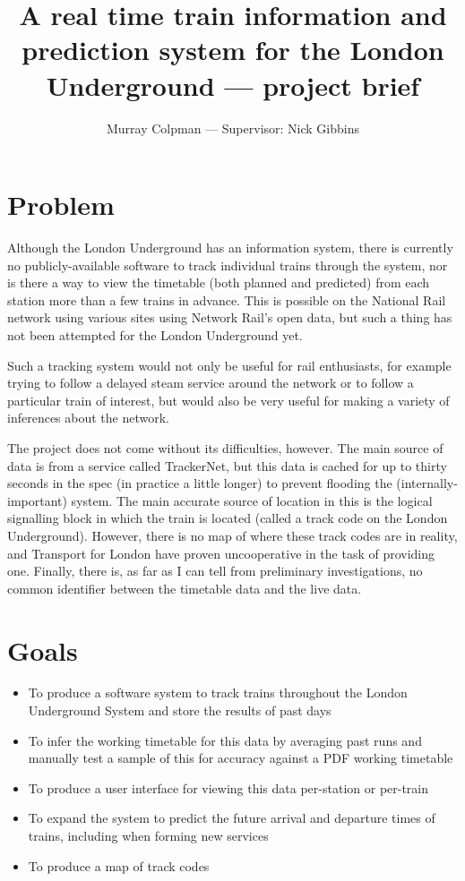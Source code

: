 \documentclass[a4paper,12pt]{article}
\title{A real time train information and prediction system for the London Underground --- project brief}
\author{Murray Colpman --- Supervisor: Nick Gibbins}
\begin{document}
\maketitle

\section*{Problem}

Although the London Underground has an information system, there is currently
no publicly-available software to track individual trains through the system,
nor is there a way to view the timetable (both planned and predicted) from each
station more than a few trains in advance. This is possible on the National
Rail network using various sites using Network Rail's open data, but such a
thing has not been attempted for the London Underground yet.

Such a tracking system would not only be useful for rail enthusiasts, for
example trying to follow a delayed steam service around the network or to
follow a particular train of interest, but would also be very useful for making
a variety of inferences about the network.

The project does not come without its difficulties, however. The main source of
data is from a service called TrackerNet, but this data is cached for up to
thirty seconds in the spec (in practice a little longer) to prevent flooding
the (internally-important) system. The main accurate source of location in this
is the logical signalling block in which the train is located (called a track
code on the London Underground). However, there is no map of where these track
codes are in reality, and Transport for London have proven uncooperative in the
task of providing one. Finally, there is, as far as I can tell from preliminary
investigations, no common identifier between the timetable data and the live
data.

\section*{Goals}

\begin{itemize}
  \item To produce a software system to track trains throughout the London
    Underground System and store the results of past days
  \item To infer the working timetable for this data by averaging past runs and
    manually test a sample of this for accuracy against a PDF working timetable
  \item To produce a user interface for viewing this data per-station or
    per-train
  \item To expand the system to predict the future arrival and departure times
    of trains, including when forming new services
  \item To produce a map of track codes
\end{itemize}
\end{document}
